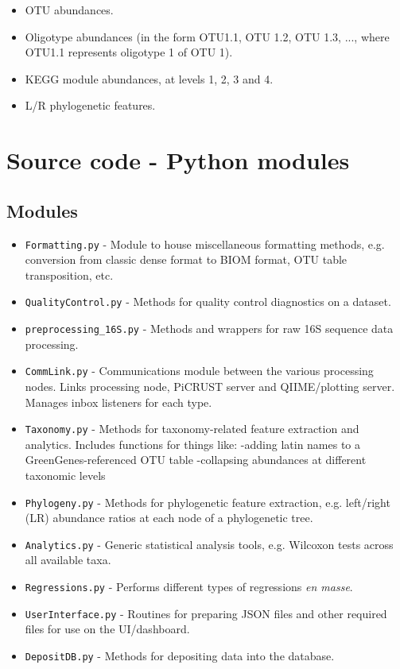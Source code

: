 \documentclass[11pt, oneside]{article}   	%
\begin{document}
\begin{itemize}
	\item OTU abundances.
	\item Oligotype abundances (in the form OTU1.1, OTU 1.2, OTU 1.3, ..., where OTU1.1 represents oligotype 1 of OTU 1).
	\item KEGG module abundances, at levels 1, 2, 3 and 4.
	\item L/R phylogenetic features.
\end{itemize}

\section{Source code - Python modules}
\subsection{Modules}
\begin{itemize}
  \item {\tt Formatting.py} - Module to house miscellaneous formatting methods, e.g. conversion from classic dense format to BIOM format, OTU table transposition, etc.
	\item {\tt QualityControl.py} - Methods for quality control diagnostics on a dataset.
	\item {\tt preprocessing\_16S.py} - Methods and wrappers for raw 16S sequence data processing.
	\item {\tt CommLink.py} - Communications module between the various processing nodes.  Links processing node, PiCRUST server and QIIME/plotting server.  Manages inbox listeners for each type.
	\item {\tt Taxonomy.py} - Methods for taxonomy-related feature extraction and analytics.  Includes functions for things like:
		-adding latin names to a GreenGenes-referenced OTU table
		-collapsing abundances at different taxonomic levels
	\item {\tt Phylogeny.py} - Methods for phylogenetic feature extraction, e.g. left/right (LR) abundance ratios at each node of a phylogenetic tree.
	\item {\tt Analytics.py} - Generic statistical analysis tools, e.g. Wilcoxon tests across all available taxa.
	\item {\tt Regressions.py} - Performs different types of regressions \textit{en masse}.
	\item {\tt UserInterface.py} - Routines for preparing JSON files and other required files for use on the UI/dashboard.
	\item {\tt DepositDB.py} - Methods for depositing data into the database.
\end{itemize}
\end{document}

